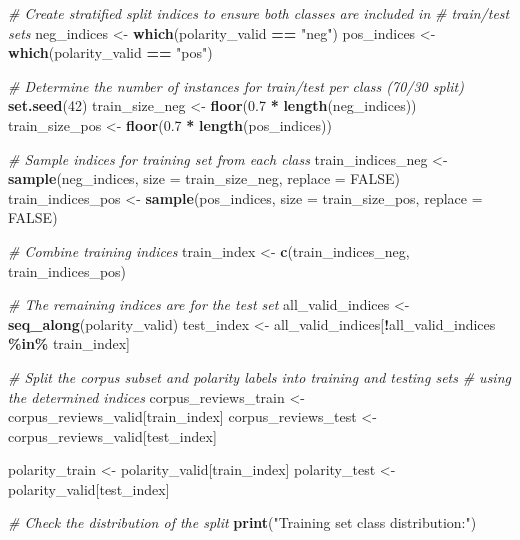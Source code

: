 \documentclass[
]{book}
\newenvironment{Shaded}{\begin{snugshade}}{\end{snugshade}}
\newcommand{\AttributeTok}[1]{\textcolor[rgb]{0.13,0.29,0.53}{#1}}
\newcommand{\CommentTok}[1]{\textcolor[rgb]{0.56,0.35,0.01}{\textit{#1}}}
\newcommand{\ConstantTok}[1]{\textcolor[rgb]{0.56,0.35,0.01}{#1}}
\newcommand{\DecValTok}[1]{\textcolor[rgb]{0.00,0.00,0.81}{#1}}
\newcommand{\FloatTok}[1]{\textcolor[rgb]{0.00,0.00,0.81}{#1}}
\newcommand{\FunctionTok}[1]{\textcolor[rgb]{0.13,0.29,0.53}{\textbf{#1}}}
\newcommand{\NormalTok}[1]{#1}
\newcommand{\OtherTok}[1]{\textcolor[rgb]{0.56,0.35,0.01}{#1}}
\newcommand{\SpecialCharTok}[1]{\textcolor[rgb]{0.81,0.36,0.00}{\textbf{#1}}}
\newcommand{\StringTok}[1]{\textcolor[rgb]{0.31,0.60,0.02}{#1}}
\begin{document}
\begin{Shaded}
\begin{Highlighting}[]
\CommentTok{\# Create stratified split indices to ensure both classes are included in}
\CommentTok{\# train/test sets}
\NormalTok{neg\_indices }\OtherTok{\textless{}{-}} \FunctionTok{which}\NormalTok{(polarity\_valid }\SpecialCharTok{==} \StringTok{"neg"}\NormalTok{)}
\NormalTok{pos\_indices }\OtherTok{\textless{}{-}} \FunctionTok{which}\NormalTok{(polarity\_valid }\SpecialCharTok{==} \StringTok{"pos"}\NormalTok{)}

\CommentTok{\# Determine the number of instances for train/test per class (70/30 split)}
\FunctionTok{set.seed}\NormalTok{(}\DecValTok{42}\NormalTok{)}
\NormalTok{train\_size\_neg }\OtherTok{\textless{}{-}} \FunctionTok{floor}\NormalTok{(}\FloatTok{0.7} \SpecialCharTok{*} \FunctionTok{length}\NormalTok{(neg\_indices))}
\NormalTok{train\_size\_pos }\OtherTok{\textless{}{-}} \FunctionTok{floor}\NormalTok{(}\FloatTok{0.7} \SpecialCharTok{*} \FunctionTok{length}\NormalTok{(pos\_indices))}

\CommentTok{\# Sample indices for training set from each class}
\NormalTok{train\_indices\_neg }\OtherTok{\textless{}{-}} \FunctionTok{sample}\NormalTok{(neg\_indices, }\AttributeTok{size =}\NormalTok{ train\_size\_neg, }\AttributeTok{replace =} \ConstantTok{FALSE}\NormalTok{)}
\NormalTok{train\_indices\_pos }\OtherTok{\textless{}{-}} \FunctionTok{sample}\NormalTok{(pos\_indices, }\AttributeTok{size =}\NormalTok{ train\_size\_pos, }\AttributeTok{replace =} \ConstantTok{FALSE}\NormalTok{)}

\CommentTok{\# Combine training indices}
\NormalTok{train\_index }\OtherTok{\textless{}{-}} \FunctionTok{c}\NormalTok{(train\_indices\_neg, train\_indices\_pos)}

\CommentTok{\# The remaining indices are for the test set}
\NormalTok{all\_valid\_indices }\OtherTok{\textless{}{-}} \FunctionTok{seq\_along}\NormalTok{(polarity\_valid)}
\NormalTok{test\_index }\OtherTok{\textless{}{-}}\NormalTok{ all\_valid\_indices[}\SpecialCharTok{!}\NormalTok{all\_valid\_indices }\SpecialCharTok{\%in\%}\NormalTok{ train\_index]}

\CommentTok{\# Split the corpus subset and polarity labels into training and testing sets}
\CommentTok{\# using the determined indices}
\NormalTok{corpus\_reviews\_train }\OtherTok{\textless{}{-}}\NormalTok{ corpus\_reviews\_valid[train\_index]}
\NormalTok{corpus\_reviews\_test }\OtherTok{\textless{}{-}}\NormalTok{ corpus\_reviews\_valid[test\_index]}

\NormalTok{polarity\_train }\OtherTok{\textless{}{-}}\NormalTok{ polarity\_valid[train\_index]}
\NormalTok{polarity\_test }\OtherTok{\textless{}{-}}\NormalTok{ polarity\_valid[test\_index]}

\CommentTok{\# Check the distribution of the split}
\FunctionTok{print}\NormalTok{(}\StringTok{"Training set class distribution:"}\NormalTok{)}
\end{Highlighting}
\end{Shaded}
\end{document}
